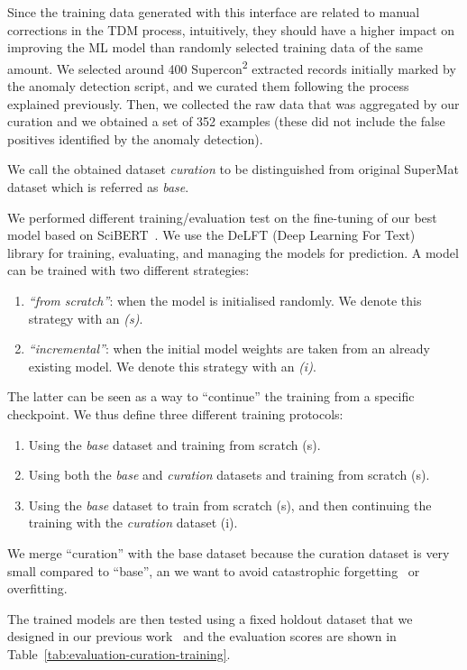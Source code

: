 \documentclass[a4paper]{article}
\begin{document}
Since the training data generated with this interface are related to manual corrections in the TDM process, intuitively, they should have a higher impact on improving the ML model than randomly selected training data of the same amount. 
We selected around 400 Supercon\textsuperscript{2} extracted records initially marked by the anomaly detection script, and we curated them following the process explained previously. 
Then, we collected the raw data that was aggregated by our curation and we obtained a set of 352 examples (these did not include the false positives identified by the anomaly detection).

We call the obtained dataset \emph{curation} to be distinguished from original SuperMat dataset which is referred as \emph{base}.

We performed different training/evaluation test on the fine-tuning of our best model based on SciBERT~\cite{Beltagy2019SciBERT}. We use the DeLFT (Deep Learning For Text)~\cite{DeLFT} library for training, evaluating, and managing the models for prediction.  A model can be trained with two different strategies: 
\begin{enumerate}
    \item \emph{``from scratch''}: when the model is initialised randomly. We denote this strategy with an \emph{(s)}.
    \item \emph{``incremental''}: when the initial model weights are taken from an already existing model. We denote this strategy with an \emph{(i)}.
\end{enumerate}
The latter can be seen as a way to ``continue'' the training from a specific checkpoint. We thus define three different training protocols: 
\begin{enumerate}
    \item Using the \emph{base} dataset and training from scratch (s).
    \item Using both the \emph{base} and \emph{curation} datasets and training from scratch (s).
    \item Using the \emph{base} dataset to train from scratch (s), and then continuing the training with the \emph{curation} dataset (i).
\end{enumerate}
We merge ``curation'' with the base dataset because the curation dataset is very small compared to ``base'', an we want to avoid catastrophic forgetting~\cite{overcoming-kirkpatrick-etal-2016} or overfitting.

The trained models are then tested using a fixed holdout dataset that we designed in our previous work~\cite{lfoppiano2023automatic} and the evaluation scores are shown in Table~\ref{tab:evaluation-curation-training}.
\end{document}
